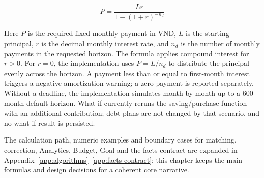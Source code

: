 \begin{equation}
  P=\frac{Lr}{1-(1+r)^{-n_d}}
\end{equation}

Here $P$ is the required fixed monthly payment in VND, $L$ is the starting principal, $r$ is the decimal monthly interest rate, and $n_d$ is the number of monthly payments in the requested horizon. The formula applies compound interest for $r>0$. For $r=0$, the implementation uses $P=L/n_d$ to distribute the principal evenly across the horizon. A payment less than or equal to first-month interest triggers a negative-amortization warning; a zero payment is reported separately. Without a deadline, the implementation simulates month by month up to a 600-month default horizon. What-if currently reruns the saving/purchase function with an additional contribution; debt plans are not changed by that scenario, and no what-if result is persisted.



The calculation path, numeric examples and boundary cases for matching, correction, Analytics, Budget, Goal and the facts contract are expanded in Appendix~\ref{app:algorithms}--\ref{app:facts-contract}; this chapter keeps the main formulas and design decisions for a coherent core narrative.

